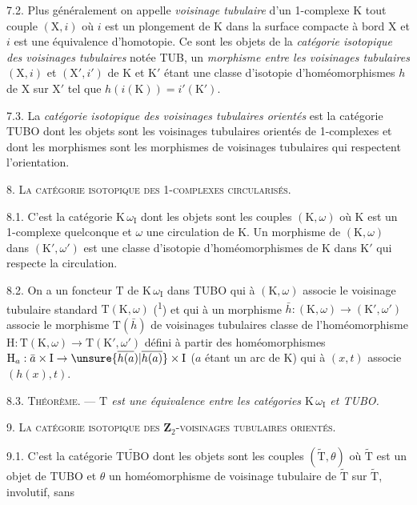 7.2. Plus généralement on appelle \textit{voisinage tubulaire} d'un 1-complexe \(\mathrm{K}\) tout couple \((\mathrm{X},i)\) où \(i\) est un plongement de \(\mathrm{K}\) dans la surface compacte à bord \(\mathrm{X}\) et \(i\) est une équivalence d'homotopie. Ce sont les objets de la \textit{catégorie isotopique des voisinages tubulaires} notée TUB, un \textit{morphisme entre les voisinages tubulaires} \((\mathrm{X},i)\) et \((\mathrm{X}',i')\) de \(\mathrm{K}\) et \(\mathrm{K}'\) étant une classe d'isotopie d'homéomorphismes \(h\) de \(\mathrm{X}\) sur \(\mathrm{X}'\) tel que \(h(i(\mathrm{K}))=i'(\mathrm{K}')\).

7.3. La \textit{catégorie isotopique des voisinages tubulaires orientés} est la catégorie TUBO dont les objets sont les voisinages tubulaires orientés de 1-complexes et dont les morphismes sont les morphismes de voisinages tubulaires qui respectent l'orientation.

8. \textsc{La catégorie isotopique des 1-complexes circularisés.}

8.1. C'est la catégorie \(\mathrm{K}\,\omega_{\mathrm{I}}\) dont les objets sont les couples \((\mathrm{K},\omega)\) où \(\mathrm{K}\) est un 1-complexe quelconque et \(\omega\) une circulation de \(\mathrm{K}\). Un morphisme de \((\mathrm{K},\omega)\) dans \((\mathrm{K}',\omega')\) est une classe d'isotopie d'homéomorphismes de \(\mathrm{K}\) dans \(\mathrm{K}'\) qui respecte la circulation.

8.2. On a un foncteur \(\mathrm{T}\) de \(\mathrm{K}\,\omega_{\mathrm{I}}\) dans TUBO qui à \((\mathrm{K},\omega)\) associe le voisinage tubulaire standard \(\mathrm{T}(\mathrm{K},\omega)\) (\textsuperscript{1}) et qui à un morphisme \(\bar h:(\mathrm{K},\omega)\to(\mathrm{K}',\omega')\) associe le morphisme \(\mathrm{T}(\bar h)\) de voisinages tubulaires classe de l'homéomorphisme \(\mathrm{H}:\mathrm{T}(\mathrm{K},\omega)\to\mathrm{T}(\mathrm{K}',\omega')\) défini à partir des homéomorphismes \(\mathrm{H}_a:\bar a\times\mathrm{I}\to\unsure{\overline{h(a})|\overline{h(a)}}\times\mathrm{I}\) (\(a\) étant un arc de \(\mathrm{K}\)) qui à \((x,t)\) associe \((h(x),t)\).


8.3. \textsc{Théorème.} --- \textit{\(\mathrm{T}\) est une équivalence entre les catégories \(\mathrm{K}\,\omega_{\mathrm{I}}\) et TUBO.}

9. \textsc{La catégorie isotopique des \(\mathbf{Z}_2\)-voisinages tubulaires orientés.}

9.1. C'est la catégorie \(\widetilde{\mathrm{TUBO}}\) dont les objets sont les couples \((\widetilde{\mathrm{T}},\theta)\) où \(\widetilde{\mathrm{T}}\) est un objet de TUBO et \(\theta\) un homéomorphisme de voisinage tubulaire de \(\widetilde{\mathrm{T}}\) sur \(\widetilde{\mathrm{T}}\), involutif, sans

